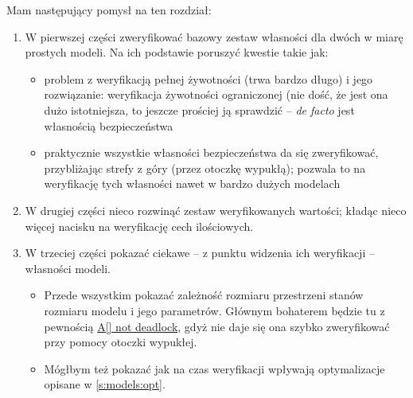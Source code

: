 \documentclass{pracamgr}
\theoremstyle{plain}
\begin{document}
  Mam następujący pomysł na ten rozdział:
  \begin{enumerate}
    \item W pierwszej części zweryfikować bazowy zestaw własności
    dla dwóch w miarę prostych modeli. Na ich podstawie poruszyć kwestie takie jak:
    \begin{itemize}
      \item problem z weryfikacją pełnej żywotności (trwa bardzo
      długo) i jego rozwiązanie: weryfikacja żywotności ograniczonej
      (nie dość, że jest ona dużo istotniejsza, to jeszcze prościej ją
      sprawdzić -- \emph{de facto} jest własnością bezpieczeństwa
      \item praktycznie wszystkie własności bezpieczeństwa da się
      zweryfikować, przybliżając strefy z góry (przez otoczkę wypukłą);
      pozwala to na weryfikację tych własności nawet w bardzo dużych modelach
    \end{itemize}
    \item W drugiej części nieco rozwinąć zestaw weryfikowanych
    wartości; kładąc nieco więcej nacisku na weryfikację cech ilościowych.
    \item W trzeciej części pokazać ciekawe -- z punktu widzenia ich
    weryfikacji -- własności modeli.
    \begin{itemize}
      \item Przede wszystkim pokazać zależność rozmiaru przestrzeni
      stanów rozmiaru modelu i jego parametrów. Głównym bohaterem
      będzie tu z pewnością \url{A[] not deadlock}, gdyż nie daje się
      ona szybko zweryfikować przy pomocy otoczki wypukłej.
      \item Mógłbym też pokazać jak na czas weryfikacji wpływają
      optymalizacje opisane w \ref{s:models:opt}.
    \end{itemize}


  \end{enumerate}

\end{document}
